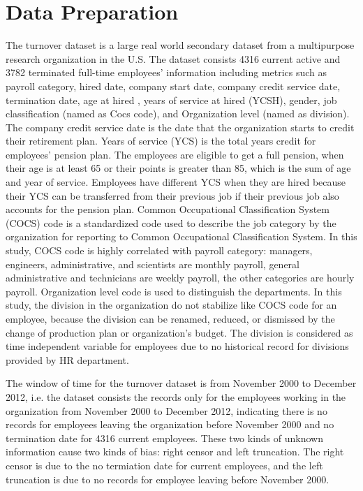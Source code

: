 \documentclass[12pt,letterpaper]{article}
\begin{document}
\section{Data Preparation}
The turnover dataset is a large real world secondary dataset from a multipurpose research organization in the U.S. The dataset consists 4316 current active and 3782 terminated full-time employees' information including metrics such as payroll category, hired date, company start date, company credit service date, termination date, age at hired , years of service at hired (YCSH), gender, job classification (named as Cocs code), and Organization level (named as division). The company credit service date is the date that the organization starts to credit their retirement plan. Years of service (YCS) is the total years credit for employees' pension plan. The employees are eligible to get a full pension, when their age is at least 65 or their points is greater than 85, which is the sum of age and year of service. Employees have different YCS when they are hired because their YCS can be transferred from their previous job if their previous job also accounts for the pension plan. %
Common Occupational Classification System (COCS) code is a standardized code used to describe the job category by the organization for reporting to Common Occupational Classification System. In this study, COCS code is highly correlated with payroll category: managers, engineers, administrative, and scientists are monthly payroll, general administrative and technicians are weekly payroll, the other categories are hourly payroll.
Organization level code is used to distinguish the departments. In this study, the division in the organization do not stabilize like COCS code for an employee, because the division can be renamed, reduced, or dismissed by the change of production plan or organization's budget. The division is considered as time independent variable for employees due to no historical record for divisions provided by HR department.

The window of time for the turnover dataset is from November 2000 to December 2012, i.e. the dataset consists the records only for the employees working in the organization from November 2000 to December 2012, indicating there is no records for employees leaving the organization before November 2000 and no termination date for 4316 current employees. These two kinds of unknown information cause two kinds of bias: right censor and left truncation. The right censor is due to the no termiation date for current employees, and the left truncation is due to no records for employee leaving before November 2000.
\end{document}
